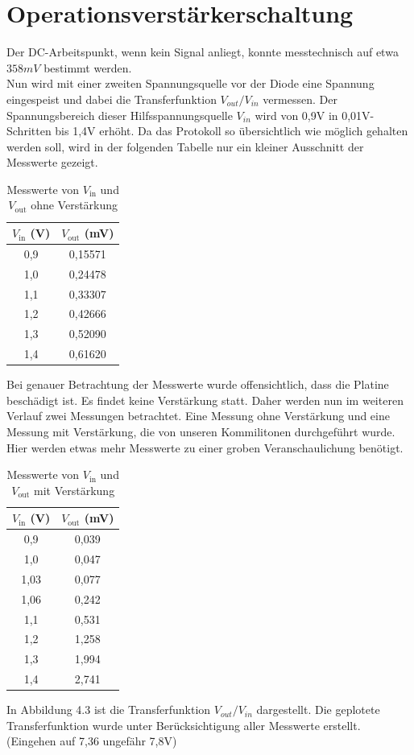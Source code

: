 \section{Operationsverstärkerschaltung} %
Der DC-Arbeitspunkt, wenn kein Signal anliegt, konnte messtechnisch auf etwa $358mV$ bestimmt werden.
\\
Nun wird mit einer zweiten Spannungsquelle vor der Diode eine Spannung eingespeist und dabei die Transferfunktion
$V_{out}/V_{in}$ vermessen. Der Spannungsbereich dieser Hilfsspannungsquelle $V_{in}$ wird von 0,9V in 0,01V-Schritten bis 1,4V erhöht.
Da das Protokoll so übersichtlich wie möglich gehalten werden soll, wird in der folgenden Tabelle nur ein kleiner Ausschnitt der
Messwerte gezeigt.
\begin{table}[h]
\centering
\begin{tabular}{|c|c|}
\hline
$V_{\text{in}}$ (V) & $V_{\text{out}}$ (mV) \\
\hline
0{,}9 & 0{,}15571 \\
1{,}0 & 0{,}24478 \\
1{,}1 & 0{,}33307 \\
1{,}2 & 0{,}42666 \\
1{,}3 & 0{,}52090 \\
1{,}4 & 0{,}61620 \\
\hline
\end{tabular}
\caption{Messwerte von $V_{\text{in}}$ und $V_{\text{out}}$ ohne Verstärkung}
\end{table}
\clearpage
Bei genauer Betrachtung der Messwerte wurde offensichtlich, dass die Platine beschädigt ist. Es findet keine Verstärkung
statt. Daher werden nun im weiteren Verlauf zwei Messungen betrachtet. Eine Messung ohne Verstärkung und eine Messung mit Verstärkung, die von 
unseren Kommilitonen durchgeführt wurde. Hier werden etwas mehr Messwerte zu einer groben Veranschaulichung benötigt. \\

\begin{table}[h]
\centering
\begin{tabular}{|c|c|}
\hline
$V_{\text{in}}$ (V) & $V_{\text{out}}$ (mV) \\
\hline
0{,}9 & 0{,}039 \\
1{,}0 & 0{,}047\\
1{,}03 & 0{,}077 \\
1{,}06 & 0{,}242 \\
1{,}1 & 0{,}531 \\
1{,}2 & 1{,}258 \\
1{,}3 & 1{,}994 \\
1{,}4 & 2{,}741 \\
\hline
\end{tabular}
\caption{Messwerte von $V_{\text{in}}$ und $V_{\text{out}}$ mit Verstärkung}
\end{table}
In Abbildung 4.3 ist die Transferfunktion $V_{out}/V_{in}$ dargestellt. Die geplotete Transferfunktion wurde
unter Berücksichtigung aller Messwerte erstellt.\\
(Eingehen auf 7,36 ungefähr 7,8V)





